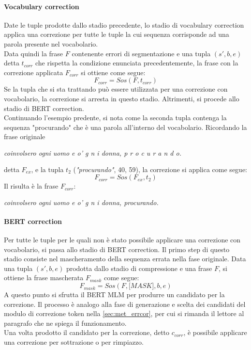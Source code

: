 \paragraph{Vocabulary correction}
Date le tuple prodotte dallo stadio precedente, lo stadio di vocabulary correction applica una correzione per tutte le tuple la cui sequenza corrisponde ad una parola presente nel vocabolario. \\
Data quindi la frase $F$ contenente errori di segmentazione e una tupla $(s\prime,b,e)$ detta $t_{corr}$ che rispetta la condizione enunciata precedentemente, la frase con la correzione applicata $F_{corr}$ si ottiene come segue:
\begin{equation}
F_{corr} = \textit{Sos}(F,t_{corr})
\end{equation}
Se la tupla che si sta trattando può essere utilizzata per una correzione con vocabolario, la correzione si arresta in questo stadio. Altrimenti, si procede allo stadio di BERT correction.\\
Continuando l'esempio predente, si nota come la seconda tupla contenga la sequenza "procurando" che è una parola all'interno del vocabolario. Ricordando la frase originale
\begin{center}
\textit{coinvolsero ogni uomo e o' g n i donna, p r o c u r a n d o.}
\end{center}
detta $F_{ex}$, e la tupla $t_2$ (\textit{"procurando"}, 40, 59), la correzione si applica come segue:
\begin{equation}
F_{corr} = \textit{Sos}(F_{ex},t_{2})
\end{equation}
Il risulta è la frase $F_{corr}$:
\begin{center}
\textit{coinvolsero ogni uomo e o' g n i donna, procurando.}
\end{center}


\paragraph{BERT correction}
Per tutte le tuple per le quali non è stato possibile applicare una correzione con vocabolario, si passa allo stadio di BERT correction. Il primo step di questo stadio consiste nel mascheramento della sequenza errata nella fase originale. Data una tupla $(s\prime,b,e)$ prodotta dallo stadio di compressione e una frase $F$, si ottiene la frase mascherata $F_{mask}$ come segue:
\begin{equation}
F_{mask} = \textit{Sos}(F,\textit{[MASK]},b,e)
\end{equation}
A questo punto si sfrutta il BERT MLM per produrre un candidato per la correzione. Il processo è analogo alla fase di generazione e scelta dei candidati del modulo di correzione token nella \autoref{sec:met_errcor}, per cui si rimanda il lettore al paragrafo che ne spiega il funzionamento.\\
Una volta prodotto il candidato per la correzione, detto $c_{corr}$, è possibile applicare una correzione per sottrazione o per rimpiazzo.


